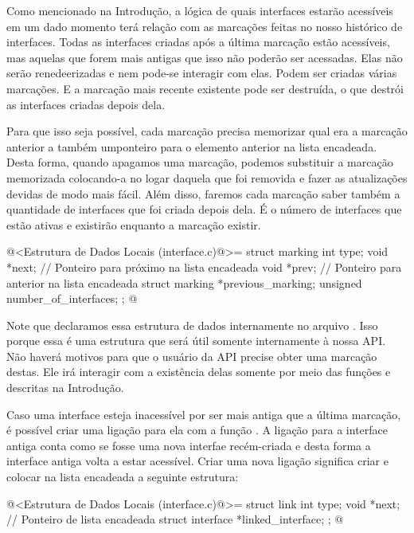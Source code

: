 
Como mencionado na Introdução, a lógica de quais interfaces estarão
acessíveis em um dado momento terá relação com as marcações feitas no
nosso histórico de interfaces. Todas as interfaces criadas após a
última marcação estão acessíveis, mas aquelas que forem mais antigas
que isso não poderão ser acessadas. Elas não serão renedeerizadas e
nem pode-se interagir com elas. Podem ser criadas várias marcações. E
a marcação mais recente existente pode ser destruída, o que destrói
as interfaces criadas depois dela.

Para que isso seja possível, cada marcação precisa memorizar qual era
a marcação anterior a também umponteiro para o elemento anterior na
lista encadeada. Desta forma, quando apagamos uma marcação, podemos
substituir a marcação memorizada colocando-a no logar daquela que foi
removida e fazer as atualizações devidas de modo mais fácil. Além
disso, faremos cada marcação saber também a quantidade de interfaces
que foi criada depois dela. É o número de interfaces que estão ativas
e existirão enquanto a marcação existir.

\iniciocodigo
@<Estrutura de Dados Locais (interface.c)@>=
struct marking {
  int type;
  void *next; // Ponteiro para próximo na lista encadeada
  void *prev; // Ponteiro para anterior na lista encadeada
  struct marking *previous_marking;
  unsigned number_of_interfaces;
};
@
\fimcodigo

Note que declaramos essa estrutura de dados internamente no arquivo
. Isso porque essa é uma estrutura que será
útil somente internamente à nossa API. Não haverá motivos para que o
usuário da API precise obter uma marcação destas. Ele irá interagir
com a existência delas somente por meio das funções
 e
 descritas na Introdução.


Caso uma interface esteja inacessível por ser mais antiga que a última
marcação, é possível criar uma ligação para ela com a função
. A ligação para a interface antiga
conta como se fosse uma nova interfae recém-criada e desta forma a
interface antiga volta a estar acessível. Criar uma nova ligação
significa criar e colocar na lista encadeada a seguinte estrutura:

\iniciocodigo
@<Estrutura de Dados Locais (interface.c)@>=
struct link {
  int type;
  void *next; // Ponteiro de lista encadeada
  struct interface *linked_interface;
};
@
\fimcodigo

